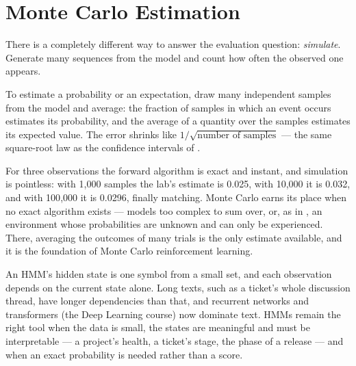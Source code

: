 \section{Monte Carlo Estimation}

There is a completely different way to answer the evaluation question: \emph{simulate}.
Generate many sequences from the model and count how often the observed one appears.

\begin{definitionbox}
To estimate a probability or an expectation, draw many independent samples from the
model and average: the fraction of samples in which an event occurs estimates its
probability, and the average of a quantity over the samples estimates its expected
value. The error shrinks like $1/\sqrt{\text{number of samples}}$ --- the same
square-root law as the confidence intervals of .
\end{definitionbox}

For three observations the forward algorithm is exact and instant, and simulation is
pointless: with 1{,}000 samples the lab's estimate is 0.025, with 10{,}000 it is 0.032,
and with 100{,}000 it is 0.0296, finally matching. Monte Carlo earns its place when no
exact algorithm exists --- models too complex to sum over, or, as in , an
environment whose probabilities are unknown and can only be experienced. There,
averaging the outcomes of many trials is the only estimate available, and it is the
foundation of Monte Carlo reinforcement learning.

\begin{alertbox}
An HMM's hidden state is one symbol from a small set, and each observation depends on
the current state alone. Long texts, such as a ticket's whole discussion thread, have
longer dependencies than that, and recurrent networks and transformers (the Deep
Learning course) now dominate text. HMMs remain the right tool when the data is
small, the states are meaningful and must be interpretable --- a project's health, a
ticket's stage, the phase of a release --- and when an exact probability is needed
rather than a score.
\end{alertbox}

